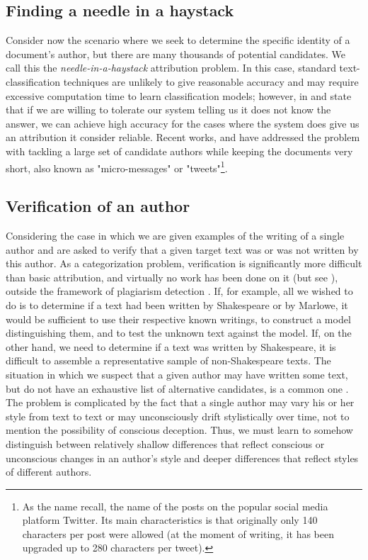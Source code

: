 \subsection{Finding a needle in a haystack}

Consider now the scenario where we seek to determine the specific identity of a document’s author, but there are many thousands of potential candidates. We call this the \textit{needle-in-a-haystack} attribution problem. In this case, standard text-classification techniques are unlikely to give reasonable accuracy and may require excessive computation time to learn classification models; however, in \cite{koppel2009computational} and \cite{koppel2011authorship} state that if we are willing to tolerate our system telling us it does not know the answer, we can achieve high accuracy for the cases where the system does give us an attribution it consider reliable.
Recent works, \cite{schwartz2013authorship} and \cite{theophilo2019needle} have addressed the problem with tackling a large set of candidate authors while keeping the documents very short, also known as "micro-messages" or "tweets"\footnote{As the name recall, the name of the posts on the popular social media platform Twitter. Its main characteristics is that originally only 140 characters per post were allowed (at the moment of writing, it has been upgraded up to 280 characters per tweet).}.

\subsection{Verification of an author}
 
Considering the case in which we are given examples of the writing of a single author and are asked to verify that a given target text was or was not written by this author. As a categorization problem, verification is significantly more difficult than basic attribution, and virtually no work has been done on it (but see \citeauthor{halteren2004linguistic} \citeyear{halteren2004linguistic}), outside the framework of plagiarism detection \citeauthor{zu2007plagiarism} \citeyear{zu2007plagiarism}. If, for example, all we wished to do is to determine if a text had been written by Shakespeare or by Marlowe, it would be sufficient to use their respective known writings, to construct a model distinguishing them, and to test the unknown text against the model. If, on the other hand, we need
to determine if a text was written by Shakespeare, it is difficult to assemble a representative sample of non-Shakespeare texts.
The situation in which we suspect that a given author may have written some text, but do not have an exhaustive list of alternative candidates, is a common one \cite{koppel2009computational}. The problem is complicated by the fact that a single author may vary his or her style from text to text or may unconsciously drift stylistically over time, not to mention the possibility of conscious deception. Thus, we must learn to somehow distinguish between relatively shallow differences that reflect conscious or unconscious changes in an author’s style and deeper differences that reflect styles of different authors.